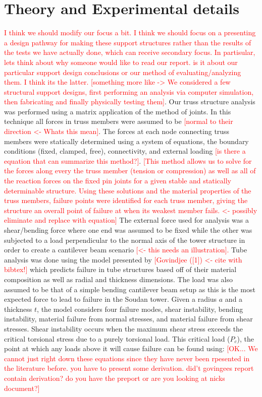 \documentclass[final]{svjour2}
\begin{document}
\section{Theory and Experimental details}
\textcolor{red}{I think we should modify our focus a bit. I think we should focus on a presenting a design pathway for making these support structures rather than the results of the tests we have actually done, which can receive secondary focus.    
In partisular, lets think about why someone would like to read our report. is it about our particular support design conclusions or our method of evaluating/analyzing them. I think its the latter.}
\textcolor{red}{[something more like -> We considered a few structural support designs, first performing an analysis via computer simulation, then  fabricating and finally physically testing them]}.  Our truss structure analysis was performed using a matrix application of the method of joints.  In this technique all forces in truss members were assumed to be \textcolor{red}{[normal to their direction <- Whats this mean]}.  The forces at each node connecting truss members were statically determined using a system of equations, the boundary conditions (fixed, clamped, free), connectivity, and external loading \textcolor{red}{[is there a equation that can summarize this method?]}.  \textcolor{red}{[This method allows us to solve for the forces along every the truss member (tension or compression) as well as all of the reaction forces on the fixed pin joints for a given stable and statically determinable structure.  Using these solutions and the material properties of the truss members, failure points were identified for each truss member, giving the structure an overall point of failure at when its weakest member fails. <- possibly eliminate and replace with equation]}  The external force used for analysis was a shear/bending force where one end was assumed to be fixed while the other was subjected to a load perpendicular to the normal axis of the tower structure in order to create a cantilever beam scenario \textcolor{red}{[<- this needs an illustration].}  
Tube analysis was done using the model presented by \textcolor{red}{[Govindjee ([1]) <- cite with bibtex!]} which predicts failure in tube structures based off of their material composition as well as radial and thickness dimensions. The load was also assumed to be that of a simple bending cantilever beam setup as this is the most expected force to lead to failure in the Soudan tower.  Given a radius $a$ and a thickness $t$, the model considers four failure modes, shear instability, bending instability, material failure from normal stresses, and material failure from shear stresses.  Shear instability occurs when the maximum shear stress exceeds the critical torsional stress due to a purely torsional load.  This critical load ($P_{c}$), the point at which any loads above it will cause failure can be found using: \textcolor{red}{[OK... We cannot just right down these equations since they have never been rpesented in the literature before. you have to present some derivation. did't govingees report contain derivation? do you have the preport or are you looking at nicks document?]}
\end{document}
